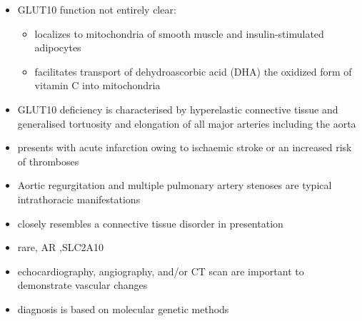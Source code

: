 \documentclass{scrartcl}
\begin{document}
\begin{itemize}
\item GLUT10 function not entirely clear:
\begin{itemize}
\item localizes to mitochondria of smooth muscle and insulin-stimulated adipocytes
\item facilitates transport of dehydroascorbic acid (DHA) the
oxidized form of vitamin C into mitochondria
\end{itemize}

\item GLUT10 deficiency is characterised by hyperelastic connective tissue
and generalised tortuosity and elongation of all major arteries
including the aorta

\item presents with acute infarction owing to ischaemic stroke or an
increased risk of thromboses
\item Aortic regurgitation and multiple pulmonary artery stenoses are
typical intrathoracic manifestations
\item closely resembles a connective tissue disorder in presentation

\item rare, AR ,SLC2A10
\item echocardiography, angiography, and/or CT scan are important to demonstrate vascular changes
\item diagnosis is based on molecular genetic methods
\end{itemize}
\end{document}
